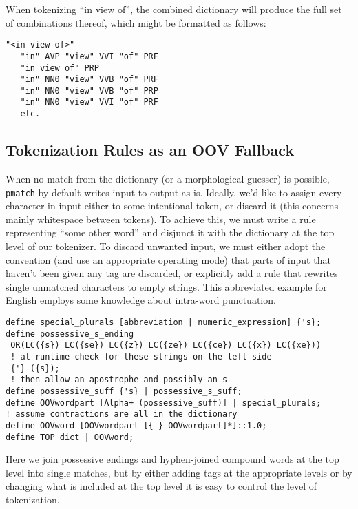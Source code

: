 \documentclass{llncs}
\begin{document}
When tokenizing ``in view of'', the combined dictionary will produce the full
set of combinations thereof, which might be formatted as follows:

\begin{framed}
\begin{verbatim}
"<in view of>"
   "in" AVP "view" VVI "of" PRF
   "in view of" PRP
   "in" NN0 "view" VVB "of" PRF
   "in" NN0 "view" VVB "of" PRP
   "in" NN0 "view" VVI "of" PRF
   etc.
\end{verbatim}
\end{framed}

\subsection{Tokenization Rules as an OOV Fallback}

When no match from the dictionary (or a morphological guesser) is possible,
\verb+pmatch+ by default
writes input to output as-is. Ideally, we'd like to assign every character
in input either to some intentional token, or discard it (this concerns mainly
whitespace between tokens). To achieve this, we must write a rule representing
``some other word'' and disjunct it with the dictionary at the top level of
our tokenizer. To discard unwanted input, we must either adopt the convention
(and use an appropriate operating mode) that parts of input that haven't been
given any tag are discarded, or explicitly add a rule that rewrites single
unmatched characters to empty strings. This abbreviated example for English
employs some knowledge about intra-word punctuation.

\begin{framed}
\begin{verbatim}
define special_plurals [abbreviation | numeric_expression] {'s};
define possessive_s_ending
 OR(LC({s}) LC({se}) LC({z}) LC({ze}) LC({ce}) LC({x}) LC({xe}))
 ! at runtime check for these strings on the left side
 {'} ({s});
 ! then allow an apostrophe and possibly an s 
define possessive_suff {'s} | possessive_s_suff;
define OOVwordpart [Alpha+ (possessive_suff)] | special_plurals;
! assume contractions are all in the dictionary
define OOVword [OOVwordpart [{-} OOVwordpart]*]::1.0;
define TOP dict | OOVword;
\end{verbatim}
\end{framed}

Here we join possessive endings and hyphen-joined compound words at the top
level into single matches, but by either adding tags at the appropriate levels
or by changing what is included at the top level it is easy to control the
level of tokenization.
\end{document}

